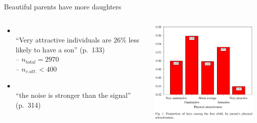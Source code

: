 \documentclass[aspectratio=169]{beamer}
\begin{document}
\begin{frame}{Beautiful parents have more daughters}

\begin{columns}
\begin{column}{5.6cm}
\begin{itemize}
\item \citet{Kanazawa07}\\[1ex]

``Very attractive individuals are 26\% less likely to have a son''
(p.~133)\\[1ex]

-- $n_{total} = 2970$\\
-- $n_{v.att.} < 400$\\[2ex] %

\item \citet{GelmanWeakliem09}\\[1ex]

``the noise is stronger than the signal'' (p.~314)
\end{itemize}
\end{column}
%
\begin{column}{8.6cm}
\includegraphics[width=8.5cm]{fig/Kanazawa}
\end{column}
\end{columns}

\end{frame}



\end{document}
